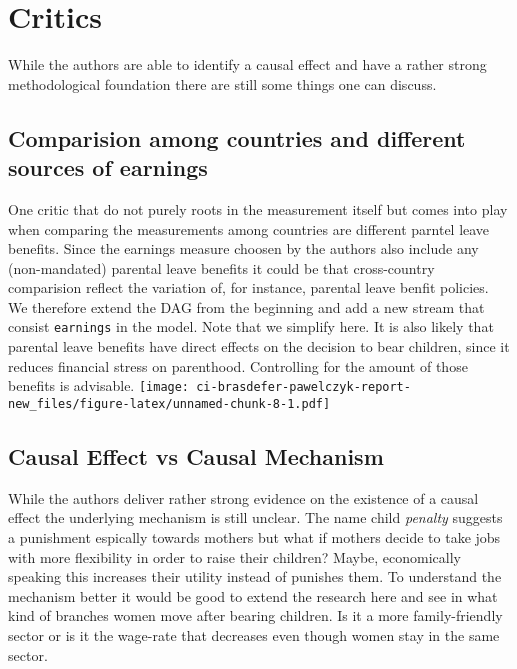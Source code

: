 \documentclass[
]{article}
\begin{document}
\hypertarget{critics}{%
\section{Critics}\label{critics}}

While the authors are able to identify a causal effect and have a rather
strong methodological foundation there are still some things one can
discuss.

\hypertarget{comparision-among-countries-and-different-sources-of-earnings}{%
\subsection{Comparision among countries and different sources of
earnings}\label{comparision-among-countries-and-different-sources-of-earnings}}

One critic that do not purely roots in the measurement itself but comes
into play when comparing the measurements among countries are different
parntel leave benefits. Since the earnings measure choosen by the
authors also include any (non-mandated) parental leave benefits it could
be that cross-country comparision reflect the variation of, for
instance, parental leave benfit policies. We therefore extend the DAG
from the beginning and add a new stream that consist \texttt{earnings}
in the model. Note that we simplify here. It is also likely that
parental leave benefits have direct effects on the decision to bear
children, since it reduces financial stress on parenthood. Controlling
for the amount of those benefits is advisable.
\texttt{[image: ci-brasdefer-pawelczyk-report-new\_files/figure-latex/unnamed-chunk-8-1.pdf]}

\hypertarget{causal-effect-vs-causal-mechanism}{%
\subsection{Causal Effect vs Causal
Mechanism}\label{causal-effect-vs-causal-mechanism}}

While the authors deliver rather strong evidence on the existence of a
causal effect the underlying mechanism is still unclear. The name child
\emph{penalty} suggests a punishment espically towards mothers but what
if mothers decide to take jobs with more flexibility in order to raise
their children? Maybe, economically speaking this increases their
utility instead of punishes them. To understand the mechanism better it
would be good to extend the research here and see in what kind of
branches women move after bearing children. Is it a more family-friendly
sector or is it the wage-rate that decreases even though women stay in
the same sector.
\end{document}
